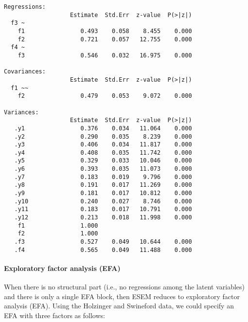 \begin{verbatim}
Regressions:
                   Estimate  Std.Err  z-value  P(>|z|)
  f3 ~                                                
    f1                0.493    0.058    8.455    0.000
    f2                0.721    0.057   12.755    0.000
  f4 ~                                                
    f3                0.546    0.032   16.975    0.000

Covariances:
                   Estimate  Std.Err  z-value  P(>|z|)
  f1 ~~                                               
    f2                0.479    0.053    9.072    0.000

Variances:
                   Estimate  Std.Err  z-value  P(>|z|)
   .y1                0.376    0.034   11.064    0.000
   .y2                0.290    0.035    8.239    0.000
   .y3                0.406    0.034   11.817    0.000
   .y4                0.408    0.035   11.742    0.000
   .y5                0.329    0.033   10.046    0.000
   .y6                0.393    0.035   11.073    0.000
   .y7                0.183    0.019    9.796    0.000
   .y8                0.191    0.017   11.269    0.000
   .y9                0.181    0.017   10.812    0.000
   .y10               0.240    0.027    8.746    0.000
   .y11               0.183    0.017   10.791    0.000
   .y12               0.213    0.018   11.998    0.000
    f1                1.000                           
    f2                1.000                           
   .f3                0.527    0.049   10.644    0.000
   .f4                0.565    0.049   11.488    0.000
\end{verbatim}

\hypertarget{exploratory-factor-analysis-efa}{%
\paragraph{Exploratory factor analysis
(EFA)}\label{exploratory-factor-analysis-efa}}

When there is no structural part (i.e., no regressions among the latent
variables) and there is only a single EFA block, then ESEM reduces to
exploratory factor analysis (EFA). Using the Holzinger and Swineford
data, we could specify an EFA with three factors as follows:

\begin{Shaded}
\begin{Highlighting}[]
\OtherTok{\textless{}{-}} \StringTok{\textquotesingle{}}
\StringTok{\textquotesingle{}}
\OtherTok{\textless{}{-}} 
 \NormalTok{)}
\end{Highlighting}
\end{Shaded}

